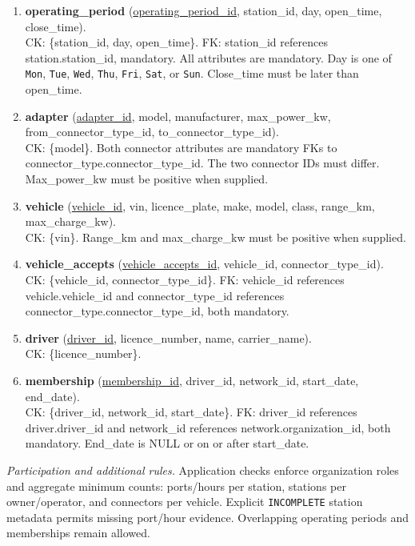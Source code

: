 \documentclass[sigconf,screen,nonacm]{acmart}
\begin{document}
\begin{enumerate}
\item \textbf{operating\_period} (\underline{operating\_period\_id}, station\_id, day, open\_time, close\_time).\\
CK: \{station\_id, day, open\_time\}. FK: station\_id references station.station\_id, mandatory. All attributes are mandatory. Day is one of \texttt{Mon}, \texttt{Tue}, \texttt{Wed}, \texttt{Thu}, \texttt{Fri}, \texttt{Sat}, or \texttt{Sun}. Close\_time must be later than open\_time.

\item \textbf{adapter} (\underline{adapter\_id}, model, manufacturer, max\_power\_kw, from\_connector\_type\_id, to\_connector\_type\_id).\\
CK: \{model\}. Both connector attributes are mandatory FKs to connector\_type.connector\_type\_id. The two connector IDs must differ. Max\_power\_kw must be positive when supplied.

\item \textbf{vehicle} (\underline{vehicle\_id}, vin, licence\_plate, make, model, class, range\_km, max\_charge\_kw).\\
CK: \{vin\}. Range\_km and max\_charge\_kw must be positive when supplied.

\item \textbf{vehicle\_accepts} (\underline{vehicle\_accepts\_id}, vehicle\_id, connector\_type\_id).\\
CK: \{vehicle\_id, connector\_type\_id\}. FK: vehicle\_id references vehicle.vehicle\_id and connector\_type\_id references connector\_type.connector\_type\_id, both mandatory.

\item \textbf{driver} (\underline{driver\_id}, licence\_number, name, carrier\_name).\\
CK: \{licence\_number\}.

\item \textbf{membership} (\underline{membership\_id}, driver\_id, network\_id, start\_date, end\_date).\\
CK: \{driver\_id, network\_id, start\_date\}. FK: driver\_id references driver.driver\_id and network\_id references network.organization\_id, both mandatory. End\_date is NULL or on or after start\_date.
\end{enumerate}

\noindent\textit{Participation and additional rules.}
Application checks enforce organization roles and aggregate minimum counts: ports/hours per station, stations per owner/operator, and connectors per vehicle. Explicit \texttt{INCOMPLETE} station metadata permits missing port/hour evidence. Overlapping operating periods and memberships remain allowed.
\end{document}

